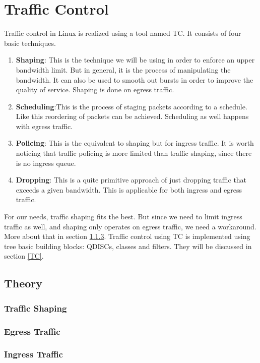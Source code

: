 \chapter{Traffic Control}
Traffic control in Linux is realized using a tool named \acs{TC}. It consists of four basic techniques.

\begin{enumerate}
\item \textbf{Shaping}: This is the technique we will be using in order to enforce an upper bandwidth limit. But in general, it is the process of manipulating the bandwidth. It can also be used to smooth out bursts in order to improve the quality of service. Shaping is done on egress traffic.

\item \textbf{Scheduling}:This is the process of staging packets according to a schedule. Like this reordering of packets can be achieved. Scheduling as well happens with egress traffic.

\item \textbf{Policing}: This is the equivalent to shaping but for ingress traffic. It is worth noticing that traffic policing is more limited than traffic shaping, since there is no ingress queue.

\item \textbf{Dropping}: This is a quite primitive approach of just dropping traffic that exceeds a given bandwidth. This is applicable for both ingress and egress traffic.
\end{enumerate}

For our needs, traffic shaping fits the best. But since we need to limit ingress traffic as well, and shaping only operates on egress traffic, we need a workaround. More about that in section  \ref{Ingress Traffic}. Traffic control using \acs{TC} is implemented using tree basic building blocks: \acp{QDISC}, classes and filters. They will be discussed in section \ref{TC}.

\section{Theory}
\subsection{Traffic Shaping}
\subsection{Egress Traffic}
\subsection{Ingress Traffic} \label{Ingress Traffic}
